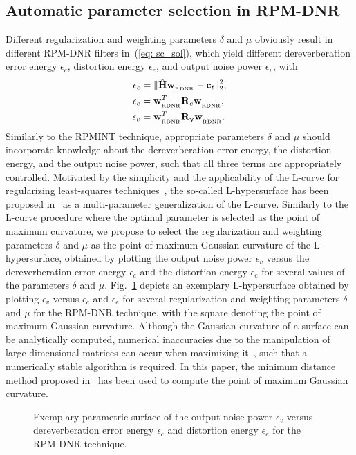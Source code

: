 \documentclass[10pt]{IEEEtran}
\begin{document}
\subsection{Automatic parameter selection in RPM-DNR}
\label{sec: auto_rp}
Different regularization and weighting parameters $\delta$ and $\mu$ obviously result in different RPM-DNR filters in~(\ref{eq: sc_sol}), which yield different dereverberation error energy $\epsilon_{c}$, distortion energy $\epsilon_{e}$, and output noise power $\epsilon_{v}$, with
\begin{align}
  \epsilon_c  &= \|\hat{\mathbf{H}} \mathbf{w}_{_{\rm RDNR}} -\mathbf{c}_t \|_2^2, \\
 \epsilon_e & = \mathbf{w}^T_{_{\rm RDNR}}\mathbf{R}_{e}\mathbf{w}^{}_{_{\rm RDNR}}, \\
  \epsilon_v &= \mathbf{w}^T_{_{\rm RDNR}} \mathbf{R}_{\mathbf{v}}\mathbf{w}^{}_{_{\rm RDNR}}.
\end{align}
Similarly to the RPMINT technique, appropriate parameters $\delta$ and $\mu$ should incorporate knowledge about the dereverberation error energy, the distortion energy, and the output noise power, such that all three terms are appropriately controlled.
Motivated by the simplicity and the applicability of the L-curve for regularizing least-squares techniques~\cite{Hansen_1993}, the so-called L-hypersurface has been proposed in~\cite{Belge_SPIE_1998} as a multi-parameter generalization of the L-curve. 
Similarly to the L-curve procedure where the optimal parameter is selected as the point of maximum curvature, we propose to select the regularization and weighting parameters $\delta$ and $\mu$ as the point of maximum Gaussian curvature of the L-hypersurface, obtained by plotting the output noise power $\epsilon_v$ versus the dereverberation error energy $\epsilon_c$ and the distortion energy $\epsilon_e$ for several values of the parameters $\delta$ and $\mu$.
Fig.~\ref{fig: L3} depicts an exemplary L-hypersurface obtained by plotting $\epsilon_{v}$ versus $\epsilon_c$ and $\epsilon_e$ for several regularization and weighting parameters $\delta$ and $\mu$ for the RPM-DNR technique, with the square denoting the point of maximum Gaussian curvature.
Although the Gaussian curvature of a surface can be analytically computed, numerical inaccuracies due to the manipulation of large-dimensional matrices can occur when maximizing it~\cite{Belge_IP_2002}, such that a numerically stable algorithm is required.
In this paper, the minimum distance method proposed in~\cite{Belge_IP_2002} has been used to compute the point of maximum Gaussian curvature. 
\begin{figure}[t!]
\centering

\caption{Exemplary parametric surface of the output noise power $\epsilon_v$ versus dereverberation error energy $\epsilon_c$ and distortion energy $\epsilon_e$ for the RPM-DNR technique.}
\label{fig: L3}
\end{figure}
\end{document}

